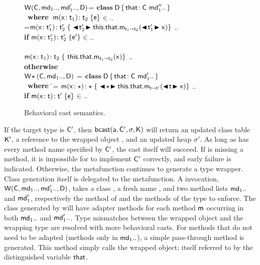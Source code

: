 \documentclass[a4paper,UKenglish]{lipics-v2018}
\newcommand{\bscast}[2]{\EM{\BehCast{#1}{{#2}}}}
\newcommand{\WHERE}{~\EM{\xt{\bf where}}~}
\newcommand{\HS}{\hspace{.2cm}}
\newcommand{\EM}[1]{\ensuremath{#1}\xspace}
\newcommand{\xt}[1]{{\sf{#1}}}
\newcommand{\bt}[1]{\xt{\bf #1}}
\newcommand{\EMxt}[1]{\EM{\xt{#1}}}
\newcommand{\x}{\EMxt x}
\newcommand{\m}{\EMxt m}
\newcommand{\s}{\EM{\sigma}}
\newcommand{\K}{\EMxt K}
\newcommand{\Kp}{{\EMxt{K'}}}
\renewcommand{\sp}{{{\EM{\s'}}}}
\newcommand{\Cp}{\EMxt{C'}}
\newcommand{\any}{\EM{\star}}
\newcommand{\this}{\EMxt{this}}
\newcommand{\that}{\EMxt{that}}
\newcommand{\FRead}[1]{\EM{\this.#1}}
\newcommand{\KCall}[5]{\EM{{#1}.{#2}_{{#4} \shortrightarrow {#5}}(#3)}}
\newcommand{\BehStart}{\EM{\blacktriangleleft}}
\newcommand{\BehEnd}{\EM{\blacktriangleright}}
\newcommand{\BehCast}[2]{\EM{\BehStart\! #1\! \BehEnd #2}}
\newcommand{\HT}[2]{\EM{{#1}\!:{#2}}}
\newcommand{\Mdef}[5]{\EM{ \HT{ #1( \HT{#2}{#3})}{#4}\;\{{#5}\}}}
\newcommand{\behcastS}[4]{\EM{\xt{bcast}(#1, #2, #3, #4)}}
\newcommand{\Class}[3]{\EM{\bt{class}\;#1\,\{\,#2~#3\,\}}}
\newcommand{\Fdef}[2]{\EM{ \HT{#1}{#2} }}
\newcommand{\wrap}[4]{\EM{\xt{W}(#1,#2,#3,#4)}}
\newcommand{\wrapAny}[3]{\EM{\xt{W}\!\any(#1,#2,#3)}}
\newcommand{\In}{\EM{\in}}
\newcommand{\src}[1]{\colorbox[gray]{0.89}{$#1$}}
\newcounter{lem}
\newcommand{\W}{\xt{W}\xspace}
\begin{document}
\begin{figure}[t]
\hspace{8mm}\begin{minipage}{12cm}\begin{tabbing}\small
\wrap\C{\md[1]..}{\mdp[1]..}\D = \src{\Class\D{\Fdef\that\C}{\mdpp[1]..}}\\
\HS\HS\WHERE\HS\= \Mdef\m\x{\t[1]}{\t[2]}\e\In\md[1].. \\
\> \mdpp[1] =\= \src{\Mdef\m\x{\tp[1]}{\tp[2]}{~\BehCast{\tp[2]}{\KCall{\FRead\that}\m{\bscast{\tp[1]}\x}{\t[1]}{\t[2]}}}} .. \\
\> \> \HS\HS \= \textbf{if} \HS \Mdef\m\x{\tp[1]}{\tp[2]}\ep\In\mdp[1].. \\
\\[-3mm]
\> \> \src{\Mdef\m\x{\t[1]}{\t[2]}{~\KCall{\FRead\that}\m{\x}{\t[1]}{\t[2]}}} .. \\ \> \> \HS\HS \textbf{otherwise}
\\[2mm]
\wrapAny{\C}{\md[1]..}{\D} = \src{\Class \D{ \Fdef\that\C}{ \mdp[1]..}}\\
\HS\HS\WHERE\HS\=\mdp[1] = \src{ \Mdef\m\x{\any}{\any}{~\BehCast\any{ \KCall{\FRead\that} \m {\bscast{\t}\x}{\t}{\tp}} } } ..
\HS\HS\HS\HS \\ \> \> \HS\HS \= \textbf{if} \HS \Mdef\m\x{\t}{\tp}\e\In\md[1].. \\
\end{tabbing}\end{minipage}

\vspace{-2mm}

\hrulefill
\caption{Behavioral cast semantics.}\label{behavetext}
\end{figure}

If the target type is \Cp, then \behcastS\a\Cp\s\K will return an updated
class table \Kp, a reference to the wrapped object \ap, and an updated heap
\sp. As long as \a has every method name specified by \Cp, the cast itself
will succeed. If \a is missing a method, it is impossible for \a to
implement \Cp correctly, and early failure is indicated. Otherwise, the
metafunction continues to generate a type wrapper. Class generation itself
is delegated to the \W metafunction. A \W invocation,
\EM{\W(\C,\md_1..,\mdp_1.., \D)}, takes a class \C, a fresh name \D, and two
method lists $\md_1..$ and $\mdp_1$, respectively the method of \C and the
methods of the type to enforce. The class generated by \W will have adapter
methods for each method \m occurring in both $\md_1..$ and $\mdp_1..$. Type
mismatches between the wrapped object and the wrapping type are resolved
with more behavioral casts. For methods that do not need to be adapted
(methods only in $\md_1..$), a simple pass-through method is generated. This
method simply calls the wrapped object; itself referred to by the
distinguished variable \that.
\end{document}
